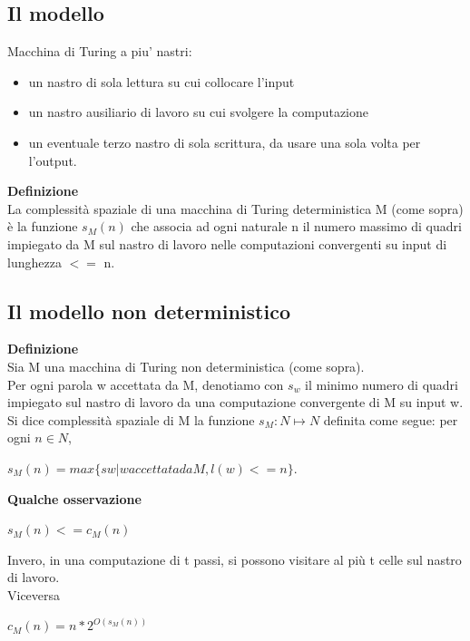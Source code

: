 \subsection{Il modello}
Macchina di Turing a piu' nastri:
\begin{itemize}
    \item un nastro di sola lettura su cui collocare l’input
    \item un nastro ausiliario di lavoro su cui svolgere la computazione
    \item un eventuale terzo nastro di sola scrittura, da usare una sola volta per l’output.
\end{itemize}
\textbf{Definizione}\\
La complessità spaziale di una macchina di Turing deterministica M (come sopra) è la funzione $s_M(n)$ che associa ad ogni naturale n il numero massimo di quadri impiegato da M sul nastro di lavoro nelle computazioni convergenti su input di lunghezza $<=$ n.
\subsection{Il modello non deterministico}
\textbf{Definizione}
\\Sia M una macchina di Turing non deterministica (come sopra).
\\Per ogni parola w accettata da M, denotiamo con $s_w$ il minimo numero di quadri impiegato sul nastro di lavoro da una computazione convergente di M su input w.
\\Si dice complessità spaziale di M la funzione $s_M : N \mapsto N$ definita come segue: per ogni $n \in N$,
\begin{center}
    $s_M(n) = max\{sw | w accettata da M, l(w) <= n\}.$
\end{center}
\textbf{Qualche osservazione}\\
\begin{center}
    $s_M (n) <= c_M (n)$
\end{center}
Invero, in una computazione di t passi, si possono visitare al più t celle sul
nastro di lavoro.
\\Viceversa
\begin{center}
    $c_M (n) = n * 2^{O(s_M(n))}$
\end{center}
